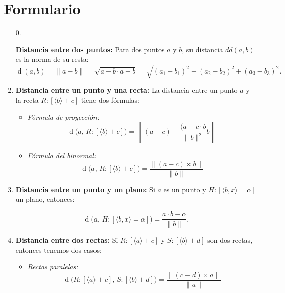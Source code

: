 \documentclass[11pt, a4paper]{article} %
\DeclareMathOperator{\dd}{d}
\begin{document}
\section{Formulario}

\begin{enumerate}[label = \textbf{\arabic*.}]

\item[0.] 

\textbf{Distancia entre dos puntos:}  Para dos puntos \(a\) y \(b\), su distancia \( dd(a,b)\) es la norma de su resta:
\[
\dd(a,b) = \|a-b\| = \sqrt{a-b\cdot a-b} = \sqrt{(a_1-b_1)^2+(a_2-b_2)^2+(a_3-b_3)^2}.
\]

\item	

\textbf{Distancia entre un punto y una recta:} La distancia entre un punto \(a\) y la recta 
\( 
R: [\langle b\rangle +c] 
\) 
tiene dos fórmulas:

\begin{itemize}

\item

\emph{Fórmula de proyección:}
\[
\dd \big(a,\, R:[\langle b \rangle +c] \big )= \left\|(a-c)-\dfrac{(a-c \cdot b}{\|b\|^2}b \right\| 
\]

\item

\emph{Fórmula del binormal:}
\[
\dd \big( a, \, R:[\langle b \rangle + c] \big) = \dfrac{ \big\|(a-c) \times b \big\|}{\| b \|} 
\]

\end{itemize}

\item	

\textbf{Distancia entre un punto y un plano:} Si \(a\) es un punto y \(H:[\langle b,x\rangle = \alpha]\) un plano, entonces:

\[
\dd \big( a, \, H:[ \langle b,x \rangle = \alpha] \big) =\dfrac{ a \cdot b - \alpha }{ \|b\| }.
\]
\item

\textbf{Distancia entre dos rectas:} Si  
\( 
R:[\langle a \rangle + c] 
\) 
y  
\( 
S: [\langle b \rangle + d]
\) 
son dos rectas, entonces tenemos dos casos:

\begin{itemize}

\item
\emph{Rectas paralelas:}
\[ 
\dd \big(  R: [ \langle a \rangle + c ], \, S : [ \langle b \rangle + d ] \big) =\dfrac{ \big\| (c-d)  \times a \big\| }{ \| a  \| }
\]


\end{itemize}
\end{enumerate}
\end{document}
